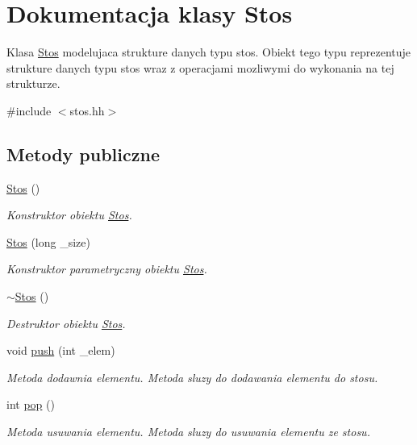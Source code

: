 \hypertarget{class_stos}{\section{Dokumentacja klasy Stos}
\label{class_stos}
}


Klasa \hyperlink{class_stos}{Stos} modelujaca strukture danych typu stos. Obiekt tego typu reprezentuje strukture danych typu stos wraz z operacjami mozliwymi do wykonania na tej strukturze.  




{\ttfamily \#include $<$stos.\-hh$>$}

\subsection*{Metody publiczne}
\begin{DoxyCompactItemize}
\item 
\hyperlink{class_stos_a1de3b50386d5dfb56ddece17d0ea2389}{Stos} ()
\begin{DoxyCompactList}\small\item\em Konstruktor obiektu \hyperlink{class_stos}{Stos}. \end{DoxyCompactList}\item 
\hyperlink{class_stos_a6606affc11eed2b059b8caf287ffca25}{Stos} (long \-\_\-size)
\begin{DoxyCompactList}\small\item\em Konstruktor parametryczny obiektu \hyperlink{class_stos}{Stos}. \end{DoxyCompactList}\item 
\hyperlink{class_stos_af9a198e2540e18adcc0b5259105fd78e}{$\sim$\-Stos} ()
\begin{DoxyCompactList}\small\item\em Destruktor obiektu \hyperlink{class_stos}{Stos}. \end{DoxyCompactList}\item 
void \hyperlink{class_stos_afd5802e405946328cccca3eed676b493}{push} (int \-\_\-elem)
\begin{DoxyCompactList}\small\item\em Metoda dodawnia elementu. Metoda sluzy do dodawania elementu do stosu. \end{DoxyCompactList}\item 
int \hyperlink{class_stos_aabb14b8a389c55da6e2b50fbb179ed56}{pop} ()
\begin{DoxyCompactList}\small\item\em Metoda usuwania elementu. Metoda sluzy do usuwania elementu ze stosu. \end{DoxyCompactList}\end{DoxyCompactItemize}
